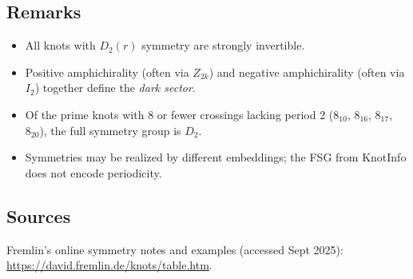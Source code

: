 \documentclass[a4paper,11pt]{article}
\begin{document}
\subsection*{Remarks}
\begin{itemize}
\item All knots with $D_2(r)$ symmetry are strongly invertible.
\item Positive amphichirality (often via $Z_{2k}$) and negative amphichirality (often via $I_2$) together define the \emph{dark sector}.
\item Of the prime knots with 8 or fewer crossings lacking period $2$ ($8_{10}$, $8_{16}$, $8_{17}$, $8_{20}$), the full symmetry group is $D_2$.
\item Symmetries may be realized by different embeddings; the FSG from KnotInfo does not encode periodicity.
\end{itemize}

\subsection*{Sources}
Fremlin's online symmetry notes and examples (accessed Sept 2025): \url{https://david.fremlin.de/knots/table.htm}.
\end{document}
